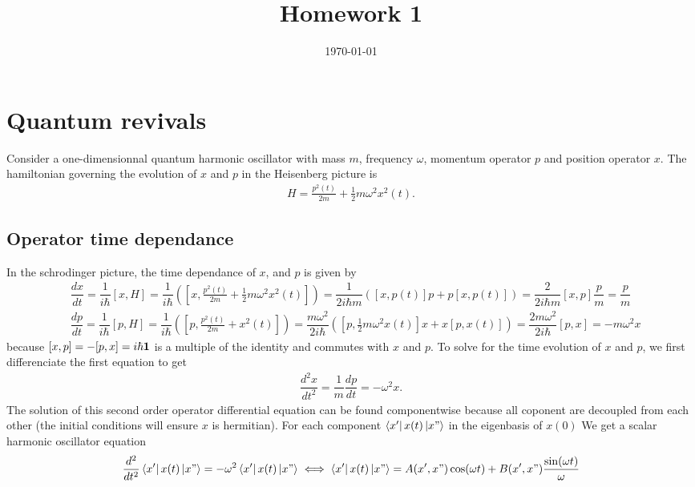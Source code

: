 \documentclass[10pt, a4paper]{article}
\title{Homework 1} %
\author{\PA} %
\date{\today} %
\begin{document}
\maketitlepage

\maketableofcontents

\section{Quantum revivals}
Consider a one-dimensionnal quantum harmonic oscillator with mass $m$, frequency $\omega$, momentum operator $p$ and position operator $x$. The hamiltonian governing the evolution of $x$ and $p$ in the Heisenberg picture is
\begin{align*}
    H=\frac{p^2(t)}{2 m}+\frac{1}{2} m \omega^2 x^2(t).
\end{align*}
\subsection{Operator time dependance}
In the schrodinger picture, the time dependance of $x$, and $p$ is given by 
\begin{align*}
    &\dfrac{dx}{dt} =\dfrac{1}{i\hbar}  [x, H] = \dfrac{1}{i\hbar} \left([x, \frac{p^2(t)}{2 m}+\frac{1}{2} m \omega^2 x^2(t)]\right) = \dfrac{1}{2i\hbar m} \left([x, p(t)]p + p[x, p(t)]\right) = \dfrac{2}{2 i\hbar m} [x, p]\dfrac{p}{m} = \dfrac{p}{m}  \\
    &\dfrac{dp}{dt} =\dfrac{1}{i\hbar}  [p, H] = \dfrac{1}{i\hbar} \left([p, \frac{p^2(t)}{2 m}+ x^2(t)]\right) = \dfrac{m \omega^2}{2i\hbar} \left([p, \frac{1}{2} m \omega^2 x(t)]x + x[p,  x(t)]\right) = \dfrac{2 m \omega^2}{2i\hbar} [p, x] = - m \omega^2 x
\end{align*}
because $[x, p] = -[p, x] = i\hbar \bf{1}$ is a multiple of the identity and commutes with $x$ and $p$. To solve for the time evolution of $x$ and $p$, we first differenciate the first equation to get 
\begin{align*}
    \dfrac{d^2 x}{dt^2} = \dfrac{1}{m} \dfrac{dp}{dt} =  -\omega^2 x. 
\end{align*}
The solution of this second order operator differential equation can be found componentwise because all coponent are decoupled from each other (the initial conditions will ensure $x$ is hermitian). For each component $\bra{x'} x(t) \ket{x"}$ in the eigenbasis of $x(0)$ We get a scalar harmonic oscillator equation
\begin{align*}
    \dfrac{d^2}{dt^2} \bra{x'} x(t) \ket{x"} = -\omega^2 \bra{x'} x(t) \ket{x"} \iff \bra{x'} x(t) \ket{x"} = A(x', x") \cos(\omega t) +  B(x', x") \dfrac{\sin(\omega t)}{\omega}
\end{align*} 
\end{document}
